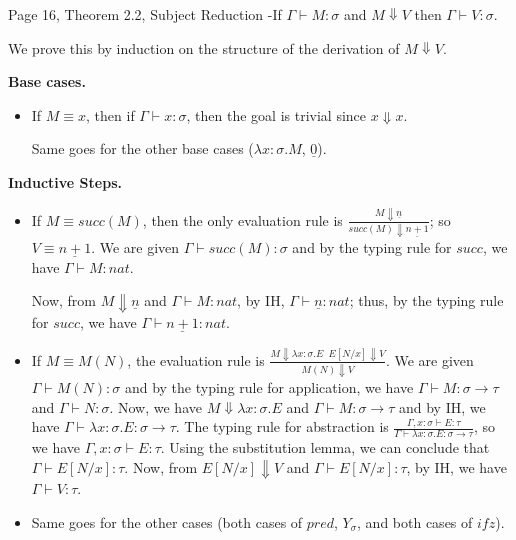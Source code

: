 \begin{problem}{Page 16, Theorem 2.2, Subject Reduction}
    -If $ \Gamma \vdash M:\sigma $ and $M \Downarrow V$ then $ \Gamma \vdash V:\sigma $.
\end{problem}

\begin{solution}
        We prove this by induction on the structure of the derivation of $M \Downarrow V$.

    \textbf{Base cases.}
    \begin{itemize}
        \item If $M \equiv x$, then if $\Gamma \vdash x:\sigma$, then the goal is trivial since $x \Downarrow x$.
        
        Same goes for the other base cases ($\lambda x:\sigma.M$, $\underline{0}$).
    \end{itemize}  
    \textbf{Inductive Steps.}
    \begin{itemize}
        \item If $M \equiv succ(M)$, then the only evaluation rule is $\frac{M \Downarrow \underline{n}}{succ(M) \Downarrow \underline{n+1}}$; so $V \equiv \underline{n+1}$.
              We are given $\Gamma \vdash succ(M):\sigma$ and by the typing rule for $succ$, we have $\Gamma \vdash M:nat$.

              Now, from $M \Downarrow \underline{n}$ and $\Gamma \vdash M:nat$, by IH, $\Gamma \vdash \underline{n}:nat$; thus, by the typing rule for $succ$, 
              we have $\Gamma \vdash \underline{n+1}:nat$.

        \item If $M \equiv M(N)$, the evaluation rule is $\frac{M \Downarrow \lambda x:\sigma.E \;\; E[N/x] \Downarrow V}{M(N) \Downarrow V}$.
              We are given $\Gamma \vdash M(N):\sigma$ and by the typing rule for application, we have $\Gamma \vdash M:\sigma \to \tau$ and $\Gamma \vdash N:\sigma$.
              Now, we have $M \Downarrow \lambda x:\sigma.E$ and $\Gamma \vdash M:\sigma \to \tau$ and by IH, we have $\Gamma \vdash \lambda x:\sigma.E:\sigma \to \tau$.
              The typing rule for abstraction is $\frac{\Gamma, x:\sigma \vdash E:\tau}{\Gamma \vdash \lambda x:\sigma.E:\sigma \to \tau}$, so we have $\Gamma, x:\sigma \vdash E:\tau$.
              Using the substitution lemma, we can conclude that $\Gamma \vdash E[N/x]:\tau$. Now, from $E[N/x] \Downarrow V$ and $\Gamma \vdash E[N/x]:\tau$, by IH, we have $\Gamma \vdash V:\tau$.

        \item Same goes for the other cases (both cases of $pred$, $Y_\sigma$, and both cases of $ifz$).
    \end{itemize}
\end{solution}